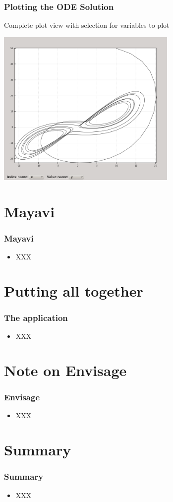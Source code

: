 \documentclass[14pt,compress]{beamer}
\begin{document}
\begin{frame}
\frametitle{Plotting the ODE Solution}
Complete plot view with selection for variables to plot
\begin{center}
    \includegraphics[height=3in, interpolate=true]{images/plot2d}
\end{center}
\end{frame}


\section{Mayavi}

\begin{frame}
  \frametitle{Mayavi}
  \begin{itemize}
      \item XXX
 \end{itemize}
\end{frame}

\section{Putting all together}

\begin{frame}
  \frametitle{The application}
  \begin{itemize}
      \item XXX
 \end{itemize}
\end{frame}

\section{Note on Envisage}

\begin{frame}
  \frametitle{Envisage}
  \begin{itemize}
      \item XXX
 \end{itemize}
\end{frame}

\section{Summary}

\begin{frame}
  \frametitle{Summary}
  \begin{itemize}
      \item XXX
 \end{itemize}
\end{frame}
\end{document}

